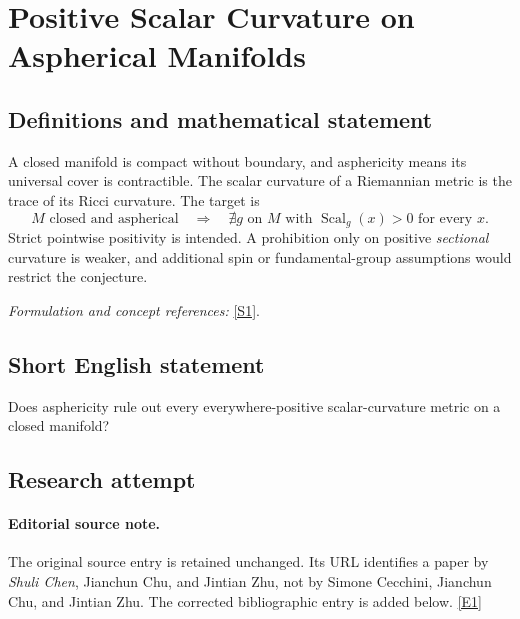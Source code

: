 \documentclass[11pt,a4paper]{article}
\newcommand{\sref}[2]{\hyperlink{source:#1:#2}{[S#2]}}
\newcommand{\eref}[2]{\hyperlink{extra:#1:#2}{[E#2]}}
\newif\ifshowcatalogue
\newcommand{\cataloguescope}[1]{\ifshowcatalogue
 \paragraph{Exact scope in the supplied catalogue.}
 \begin{quote}\small #1\end{quote}\fi}
\numberwithin{equation}{section}
\begin{document}
\setcounter{section}{0}
\setlength{\parskip}{3pt plus 1pt}
\clearpage
\section*{\texorpdfstring{Positive Scalar Curvature on Aspherical Manifolds}{Positive Scalar Curvature on Aspherical Manifolds}}\label{statement}
\subsection{Definitions and mathematical statement}
A closed manifold is compact without boundary, and asphericity means its universal cover is contractible. The scalar curvature of a Riemannian metric is the trace of its Ricci curvature. The target is
\[
 M\text{ closed and aspherical}\quad\Longrightarrow\quad
 \nexists g\text{ on }M\text{ with }\operatorname{Scal}_g(x)>0\text{ for every }x.
\]
Strict pointwise positivity is intended. A prohibition only on positive \emph{sectional} curvature is weaker, and additional spin or fundamental-group assumptions would restrict the conjecture.
\par\smallskip\textit{Formulation and concept references:} \sref{statement}{1}.
\cataloguescope{Prove or disprove that no closed aspherical manifold admits a Riemannian metric of positive scalar curvature.}
\subsection{Short English statement}
Does asphericity rule out every everywhere-positive scalar-curvature metric on a closed manifold?
\subsection{Research attempt}

\paragraph{Editorial source note.}
The original source entry is retained unchanged.  Its URL identifies a
paper by \emph{Shuli Chen}, Jianchun Chu, and Jintian Zhu, not by Simone
Cecchini, Jianchun Chu, and Jintian Zhu.  The corrected bibliographic
entry is added below. \eref{statement}{1}
\end{document}
